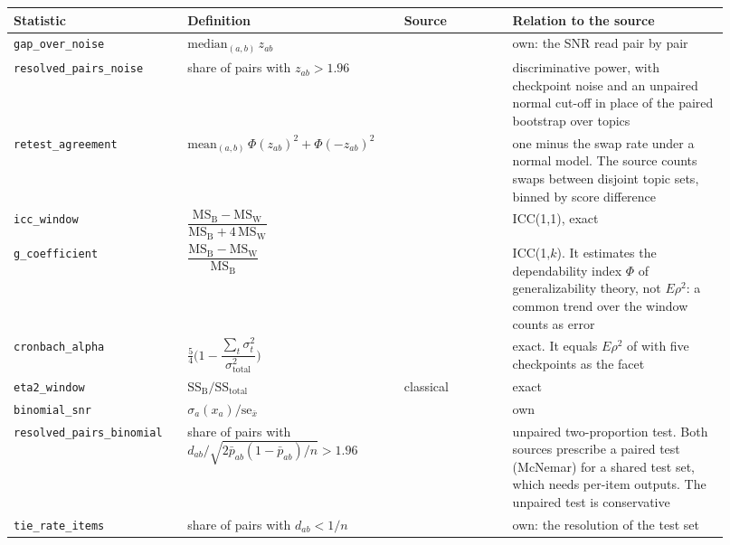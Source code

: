 \begin{table}[t]
\centering
\scriptsize
\begin{tabular}{@{}p{0.215\linewidth}p{0.28\linewidth}p{0.14\linewidth}p{0.285\linewidth}@{}}
\toprule
\textbf{Statistic} & \textbf{Definition} & \textbf{Source} & \textbf{Relation to the source} \\
\midrule
\texttt{gap\_over\_noise} & $\mathrm{median}_{(a,b)}\, z_{ab}$ & \citet{heineman_signal_2025} & own: the SNR read pair by pair \\
\texttt{resolved\_pairs\_noise} & share of pairs with $z_{ab} > 1.96$ & \citet{sakai_evaluating_2006} & discriminative power, with checkpoint noise and an unpaired normal cut-off in place of the paired bootstrap over topics \\
\texttt{retest\_agreement} & $\mathrm{mean}_{(a,b)}\,\Phi(z_{ab})^2 + \Phi(-z_{ab})^2$ & \citet{voorhees_effect_2002} & one minus the swap rate under a normal model. The source counts swaps between disjoint topic sets, binned by score difference \\
\texttt{icc\_window} & $\dfrac{\mathrm{MS_B} - \mathrm{MS_W}}{\mathrm{MS_B} + 4\,\mathrm{MS_W}}$ & \citet{shrout_intraclass_1979} & ICC(1,1), exact \\
\texttt{g\_coefficient} & $\dfrac{\mathrm{MS_B} - \mathrm{MS_W}}{\mathrm{MS_B}}$ & \citet{bodoff_test_2007, urbano_measurement_2013} & ICC(1,$k$). It estimates the dependability index $\Phi$ of generalizability theory, not $E\rho^2$: a common trend over the window counts as error \\
\texttt{cronbach\_alpha} & $\frac{5}{4}\Big(1 - \dfrac{\sum_t \sigma^2_t}{\sigma^2_{\text{total}}}\Big)$ & \citet{cronbach_coefficient_1951} & exact. It equals $E\rho^2$ of \citet{urbano_measurement_2013} with five checkpoints as the facet \\
\texttt{eta2\_window} & $\mathrm{SS_B}/\mathrm{SS_{total}}$ & classical & exact \\
\texttt{binomial\_snr} & $\sigma_a(x_a)/\mathrm{se}_{\bar{x}}$ & \citet{card_little_2020, miller_adding_2024} & own \\
\texttt{resolved\_pairs\_binomial} & share of pairs with $d_{ab}/\sqrt{2\bar{p}_{ab}(1-\bar{p}_{ab})/n} > 1.96$ & \citet{card_little_2020, dror_hitchhikers_2018} & unpaired two-proportion test. Both sources prescribe a paired test (McNemar) for a shared test set, which needs per-item outputs. The unpaired test is conservative \\
\texttt{tie\_rate\_items} & share of pairs with $d_{ab} < 1/n$ & \citet{schaeffer_are_2023} & own: the resolution of the test set \\

\end{tabular}
\end{table}
